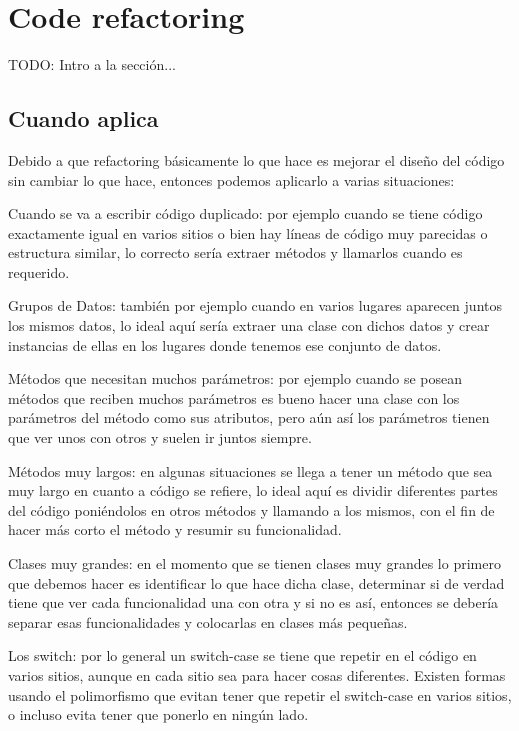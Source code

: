 \documentclass{article}
\begin{document}
\hypertarget{code_refactoring}{}
\section{Code refactoring}

TODO: Intro a la sección...

\hypertarget{cuando_aplica}{}
\subsection{Cuando aplica}

Debido a que refactoring básicamente lo que hace es mejorar el diseño del código sin cambiar lo que hace, entonces podemos aplicarlo a varias situaciones:

\begin{compactitem}
\item Cuando se va a escribir código duplicado: por ejemplo cuando se tiene código exactamente igual en varios sitios o bien hay líneas de código muy parecidas o estructura similar, lo correcto sería extraer métodos y llamarlos cuando es requerido.
\item Grupos de Datos: también por ejemplo cuando en varios lugares aparecen juntos los mismos datos, lo ideal aquí sería extraer una clase con dichos datos y crear instancias de ellas en los lugares donde tenemos ese conjunto de datos.
\item Métodos que necesitan muchos parámetros: por ejemplo cuando se posean métodos que reciben muchos parámetros es bueno hacer una clase con los parámetros del método como sus atributos, pero aún así los parámetros tienen que ver unos con otros y suelen ir juntos siempre.
\item Métodos muy largos: en algunas situaciones se llega a tener un método que sea muy largo en cuanto a código se refiere, lo ideal aquí es dividir diferentes partes del código poniéndolos en otros métodos y llamando a los mismos, con el fin de hacer más corto el método y resumir su funcionalidad.
\item Clases muy grandes: en el momento que se tienen clases muy grandes lo primero que debemos hacer es identificar lo que hace dicha clase, determinar si de verdad tiene que ver cada funcionalidad una con otra y si no es así, entonces se debería separar esas funcionalidades y colocarlas en clases más pequeñas.
\item Los switch: por lo general un switch-case se tiene que repetir en el código en varios sitios, aunque en cada sitio sea para hacer cosas diferentes. Existen formas usando el polimorfismo que evitan tener que repetir el switch-case en varios sitios, o incluso evita tener que ponerlo en ningún lado.

\end{compactitem}
\end{document}
